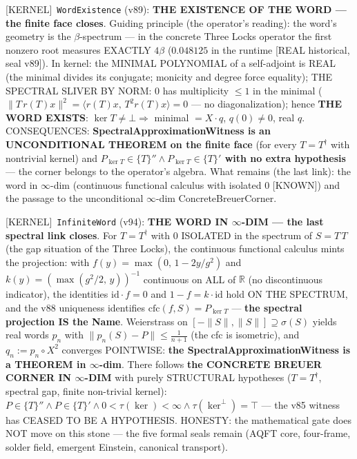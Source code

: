 \documentclass[11pt]{article}
\providecommand{\kernelmk}[1]{\textsf{[KERNEL]}~\texttt{#1}}\providecommand{\knownmk}[1]{\textsf{[KNOWN]}~{#1}}\providecommand{\statusmk}[1]{\textsf{[#1]}}
\theoremstyle{definition}\newtheorem{deriv}{Derivation}
\begin{document}
\kernelmk{WordExistence} (v89): \textbf{THE EXISTENCE OF THE WORD --- the finite face closes}. Guiding principle (the operator's reading): the word's geometry is the $\beta$-spectrum --- in the concrete Three Locks operator the first nonzero root measures EXACTLY $4\beta$ ($0.048125$ in the runtime [REAL historical, seal v89]). In kernel: the MINIMAL POLYNOMIAL of a self-adjoint is REAL (the minimal divides its conjugate; monicity and degree force equality); THE SPECTRAL SLIVER BY NORM: $0$ has multiplicity $\le1$ in the minimal ($\|T\,r(T)x\|^2=\langle r(T)x,\,T^2r(T)x\rangle=0$ --- no diagonalization); hence \textbf{THE WORD EXISTS}: $\ker T\neq\bot\Rightarrow$ minimal $=X\cdot q$, $q(0)\neq0$, real $q$. CONSEQUENCES: \textbf{SpectralApproximationWitness is an UNCONDITIONAL THEOREM on the finite face} (for every $T=T^\dagger$ with nontrivial kernel) and \textbf{$P_{\ker T}\in\{T\}''\wedge P_{\ker T}\in\{T\}'$ with no extra hypothesis} --- the corner belongs to the operator's algebra. What remains (the last link): the word in $\infty$-dim (continuous functional calculus with isolated $0$ [KNOWN]) and the passage to the unconditional $\infty$-dim ConcreteBreuerCorner.

\kernelmk{InfiniteWord} (v94): \textbf{THE WORD IN $\infty$-DIM --- the last spectral link closes}. For $T=T^\dagger$ with $0$ ISOLATED in the spectrum of $S=T\,T$ (the gap situation of the Three Locks), the continuous functional calculus mints the projection: with $f(y)=\max(0,\,1-2y/g^2)$ and $k(y)=(\max(g^2/2,\,y))^{-1}$ continuous on ALL of $\mathbb R$ (no discontinuous indicator), the identities $\mathrm{id}\cdot f=0$ and $1-f=k\cdot\mathrm{id}$ hold ON THE SPECTRUM, and the v88 uniqueness identifies $\mathrm{cfc}(f,S)=P_{\ker T}$ --- \textbf{the spectral projection IS the Name}. Weierstrass on $[-\|S\|,\|S\|]\supseteq\sigma(S)$ yields real words $p_n$ with $\|p_n(S)-P\|\le\tfrac1{n+1}$ (the cfc is isometric), and $q_n:=p_n\circ X^2$ converges POINTWISE: \textbf{the SpectralApproximationWitness is a THEOREM in $\infty$-dim}. There follows \textbf{the CONCRETE BREUER CORNER IN $\infty$-DIM} with purely STRUCTURAL hypotheses ($T=T^\dagger$, spectral gap, finite non-trivial kernel): $P\in\{T\}''\wedge P\in\{T\}'\wedge 0<\tau(\ker)<\infty\wedge\tau(\ker^\perp)=\top$ --- the v85 witness has CEASED TO BE A HYPOTHESIS. HONESTY: the mathematical gate does NOT move on this stone --- the five formal seals remain (AQFT core, four-frame, solder field, emergent Einstein, canonical transport).
\end{document}
